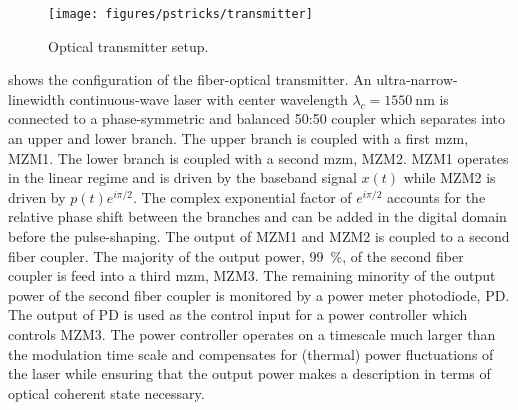 \begin{figure}[htb]
	\centering
	\texttt{[image: figures/pstricks/transmitter]}
	\caption{Optical transmitter setup.}\label{fig:optical_transmitter}
\end{figure}
 shows the configuration of the fiber-optical transmitter.
An ultra-narrow-linewidth continuous-wave laser with center wavelength $\lambda_c=\SI{1550}{\nano\meter}$ is connected to a phase-symmetric and balanced 50:50 coupler which separates into an upper and lower branch.
The upper branch is coupled with a first \gls{mzm}, MZM1.
The lower branch is coupled with a second \gls{mzm}, MZM2.
MZM1 operates in the linear regime and is driven by the baseband signal $x(t)$ while MZM2 is driven by $p(t)e^{i\pi/2}$.
The complex exponential factor of $e^{i\pi/2}$ accounts for the relative phase shift between the branches and can be added in the digital domain before the pulse-shaping.
The output of MZM1 and MZM2 is coupled to a second fiber coupler.
The majority of the output power, \SI{99}{\percent}, of the second fiber coupler is feed into a third \gls{mzm}, MZM3.
The remaining minority of the output power of the second fiber coupler is monitored by a power meter photodiode, PD.
The output of PD is used as the control input for a power controller which controls MZM3.
The power controller operates on a timescale much larger than the modulation time scale and compensates for (thermal) power fluctuations of the laser while ensuring that the output power makes a description in terms of optical coherent state necessary.

